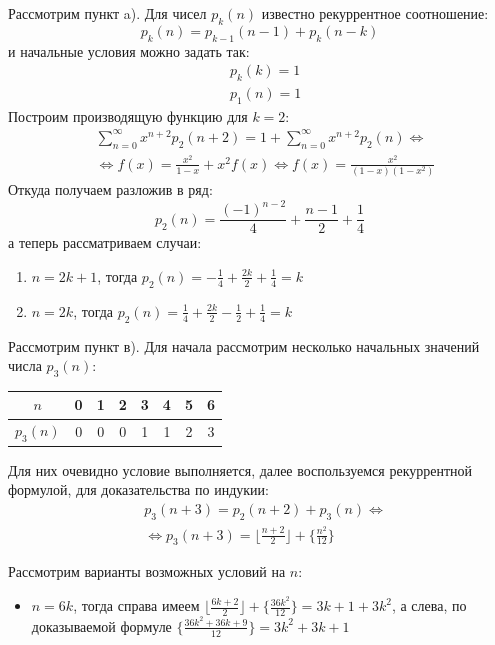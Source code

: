 \documentclass[a4paper,12pt]{article}
\begin{document}
\begin{Solution}
Рассмотрим пункт a). Для чисел $p_k\left(n\right)$ известно рекуррентное соотношение:
\[
	p_k\left(n\right) = p_{k-1}\left(n-1\right) + p_k\left(n-k\right)
\]
и начальные условия можно задать так:
\[
	\begin{split}
		&p_k\left(k\right) = 1\\
		&p_1\left(n\right) = 1
	\end{split}
\]
Построим производящую функцию для $k = 2$:
\[
	\begin{split}
		&\sum_{n=0}^{\infty} x^{n+2} p_2\left(n+2\right) = 1 + \sum_{n=0}^{\infty}x^{n+2} p_2\left(n\right) \Leftrightarrow \\
		&\Leftrightarrow f\left(x\right) = \frac{x^2}{1-x} + x^2 f\left(x\right) \Leftrightarrow f\left(x\right) = \frac{x^2}{\left(1-x\right)\left(1-x^2\right)}
	\end{split}
\]
Откуда получаем разложив в ряд:
\[
	p_2\left(n\right) = \frac{\left(-1\right)^{n-2}}{4} + \frac{n-1}{2} + \frac{1}{4}
\]
а теперь рассматриваем случаи:
\begin{enumerate}
\item $n = 2k + 1$, тогда $p_2\left(n\right) = -\frac{1}{4} + \frac{2k}{2} + \frac{1}{4} = k$

\item $n = 2k$, тогда $p_2\left(n\right) = \frac{1}{4} + \frac{2k}{2} - \frac{1}{2} + \frac{1}{4} = k$
\end{enumerate}

Рассмотрим пункт в). Для начала рассмотрим несколько начальных значений числа $p_3\left(n\right)$:

\begin{tabular}[t]{|c|c|c|c|c|c|c|c|}
\hline
$n$                 & 0 & 1 & 2 & 3 & 4 & 5 & 6 \\
\hline
$p_3\left(n\right)$ & 0 & 0 & 0 & 1 & 1 & 2 & 3 \\
\hline
\end{tabular}

Для них очевидно условие выполняется, далее воспользуемся рекуррентной формулой, для доказательства по индукии:
\[
	\begin{split}
		&p_3\left(n+3\right) = p_2\left(n+2\right) + p_3\left(n\right) \Leftrightarrow \\
		&\Leftrightarrow p_3\left(n+3\right) = \lfloor \frac{n+2}{2} \rfloor + \{\frac{n^2}{12}\}
	\end{split}
\]

Рассмотрим варианты возможных условий на $n$:
\begin{itemize}
\item $n=6k$, тогда справа имеем $\lfloor \frac{6k + 2}{2} \rfloor + \{\frac{36 k^2}{12}\} = 3k + 1 + 3 k^2$, а слева, по доказываемой формуле $\{\frac{36 k^2 + 36 k + 9}{12}\} = 3 k^2 + 3k + 1$


\end{itemize}
\end{Solution}
\end{document}
